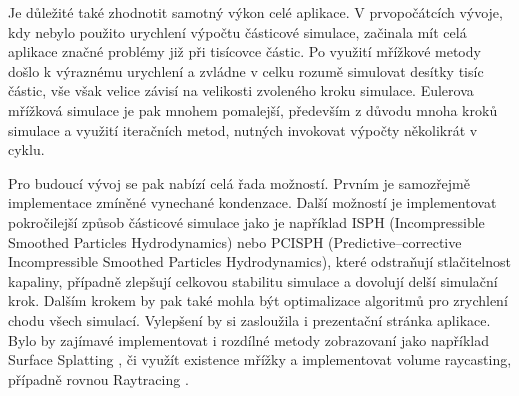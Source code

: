 Je důležité také zhodnotit samotný výkon celé aplikace. V prvopočátcích vývoje, kdy nebylo použito urychlení výpočtu částicové simulace, začinala mít celá aplikace značné problémy již při tisícovce částic. Po využití mřížkové metody došlo k výraznému urychlení a zvládne v celku rozumě simulovat desítky tisíc částic, vše však velice závisí na velikosti zvoleného kroku simulace. Eulerova mřížková simulace je pak mnohem pomalejší, především z důvodu mnoha kroků simulace a využití iteračních metod, nutných invokovat výpočty několikrát v cyklu.

Pro budoucí vývoj se pak nabízí celá řada možností. Prvním je samozřejmě implementace zmíněné vynechané kondenzace. Další možností je implementovat pokročilejší způsob částicové simulace jako je například ISPH (Incompressible Smoothed Particles Hydrodynamics) nebo PCISPH (Predictive–corrective Incompressible Smoothed Particles Hydrodynamics), které odstraňují stlačitelnost kapaliny, případně zlepšují celkovou stabilitu simulace a dovolují delší simulační krok. Dalším krokem by pak také mohla být optimalizace algoritmů pro zrychlení chodu všech simulací. Vylepšení by si zasloužila i prezentační stránka aplikace. Bylo by zajímavé implementovat i rozdílné metody zobrazovaní jako například Surface Splatting \cite{surfSplat}, či využít existence mřížky a implementovat volume raycasting, případně rovnou Raytracing \cite{volumeRT}. 



